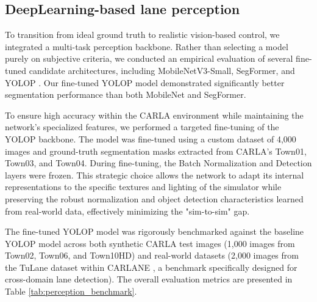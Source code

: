 \documentclass[sn-mathphys,Numbered]{sn-jnl}
\begin{document}
\subsection{DeepLearning-based lane perception}
\label{sec:perception_backbone}

To transition from ideal ground truth to realistic vision-based control, we integrated a multi-task perception backbone. Rather than selecting a model purely on subjective criteria, we conducted an empirical evaluation of several fine-tuned candidate architectures, including MobileNetV3-Small, SegFormer, and YOLOP \citep{wu2022yolop}. Our fine-tuned YOLOP model demonstrated significantly better segmentation performance than both MobileNet and SegFormer.

To ensure high accuracy within the CARLA environment while maintaining the network's specialized features, we performed a targeted fine-tuning of the YOLOP backbone. The model was fine-tuned using a custom dataset of 4,000 images and ground-truth segmentation masks extracted from CARLA's Town01, Town03, and Town04. During fine-tuning, the Batch Normalization and Detection layers were frozen. This strategic choice allows the network to adapt its internal representations to the specific textures and lighting of the simulator while preserving the robust normalization and object detection characteristics learned from real-world data, effectively minimizing the "sim-to-sim" gap.

The fine-tuned YOLOP model was rigorously benchmarked against the baseline YOLOP model across both synthetic CARLA test images (1,000 images from Town02, Town06, and Town10HD) and real-world datasets (2,000 images from the TuLane dataset within CARLANE \citep{gebele2022carlane}, a benchmark specifically designed for cross-domain lane detection). The overall evaluation metrics are presented in Table \ref{tab:perception_benchmark}.
\end{document}
